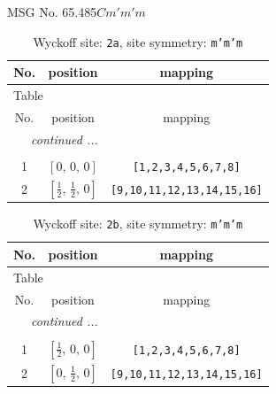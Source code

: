 \documentclass[fleqn,8pt]{jsarticle}
\begin{document}
\setcounter{MaxMatrixCols}{32}

\renewcommand{\tablename}{Table~}
\renewcommand{\figurename}{Figure~}
\begin{center}
\LARGE
MSG No. 65.485\quad$Cm'm'm$
\end{center}
\renewcommand{\arraystretch}{1.2}
\begin{longtable}{ccc}
\caption{Wyckoff site: {\tt 2a}, site symmetry: {\tt m'm'm}}
 \\
 \hline \hline
No. & position & mapping \\ \hline \endfirsthead

\multicolumn{2}{l}{\tablename\ \thetable{}} \\
 \hline \hline
No. & position & mapping \\ \hline \endhead

 \hline \hline
\multicolumn{2}{r}{\footnotesize\it continued ...} \\ \endfoot

 \hline \hline
\multicolumn{2}{r}{} \\ \endlastfoot

1 & $\left[ 0,\, 0,\, 0 \right]$ & {\tt [1,2,3,4,5,6,7,8]} \\ \hline
2 & $\left[ \frac{1}{2},\, \frac{1}{2},\, 0 \right]$ & {\tt [9,10,11,12,13,14,15,16]} \\
\end{longtable}
\renewcommand{\arraystretch}{1.2}
\begin{longtable}{ccc}
\caption{Wyckoff site: {\tt 2b}, site symmetry: {\tt m'm'm}}
 \\
 \hline \hline
No. & position & mapping \\ \hline \endfirsthead

\multicolumn{2}{l}{\tablename\ \thetable{}} \\
 \hline \hline
No. & position & mapping \\ \hline \endhead

 \hline \hline
\multicolumn{2}{r}{\footnotesize\it continued ...} \\ \endfoot

 \hline \hline
\multicolumn{2}{r}{} \\ \endlastfoot

1 & $\left[ \frac{1}{2},\, 0,\, 0 \right]$ & {\tt [1,2,3,4,5,6,7,8]} \\ \hline
2 & $\left[ 0,\, \frac{1}{2},\, 0 \right]$ & {\tt [9,10,11,12,13,14,15,16]} \\
\end{longtable}
\end{document}
